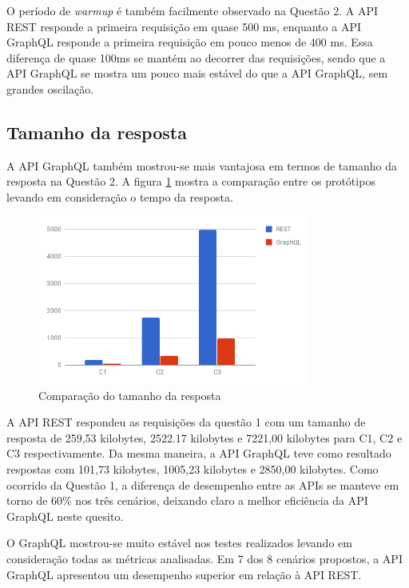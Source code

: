 O período de \textit{warmup} é também facilmente observado na Questão 2. A API REST responde a primeira requisição em quase 500 ms, enquanto a API GraphQL responde a primeira requisição em pouco menos de 400 ms. Essa diferença de quase 100ms se mantém ao decorrer das requisições, sendo que a API GraphQL se mostra um pouco mais estável do que a API GraphQL, sem grandes oscilação.

\subsection{Tamanho da resposta}

A API GraphQL também mostrou-se mais vantajosa em termos de tamanho da resposta na Questão 2. A figura \ref{fig:q2-size} mostra a comparação entre os protótipos levando em consideração o tempo da resposta.

\begin{figure}[htbp]
    \centering
    \includegraphics[width=0.8\textwidth]{figuras/q1-size.png}
    \caption{Comparação do tamanho da resposta}
    \label{fig:q2-size}
    \author{fonte: Autor}
\end{figure}

A API REST respondeu as requisições da questão 1 com um tamanho de resposta de 259,53 kilobytes, 2522.17 kilobytes e 7221,00 kilobytes para C1, C2 e C3 respectivamente. Da mesma maneira, a API GraphQL teve como resultado respostas com 101,73 kilobytes, 1005,23 kilobytes e 2850,00 kilobytes. Como ocorrido da Questão 1, a diferença de desempenho entre as APIs se manteve em torno de 60\% nos três cenários, deixando claro a melhor eficiência da API GraphQL neste quesito.

O GraphQL mostrou-se muito estável nos testes realizados levando em consideração todas as métricas analisadas. Em 7 dos 8 cenários propostos, a API GraphQL apresentou um desempenho superior em relação à API REST.